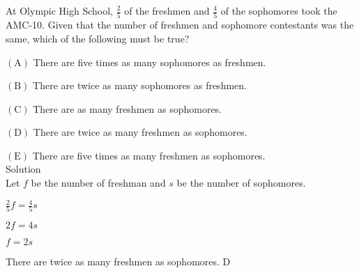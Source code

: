 
At Olympic High School, $\frac{2}{5}$ of the freshmen and $\frac{4}{5}$ of the sophomores took the AMC-10. Given that the number of freshmen and sophomore contestants was the same, which of the following must be true?

$\mathrm{(A)}$ There are five times as many sophomores as freshmen.

$\mathrm{(B)}$ There are twice as many sophomores as freshmen.

$\mathrm{(C)}$ There are as many freshmen as sophomores.

$\mathrm{(D)}$ There are twice as many freshmen as sophomores.

$\mathrm{(E)}$ There are five times as many freshmen as sophomores.
\\
Solution
\\
Let $f$ be the number of freshman and $s$ be the number of sophomores.

$\frac{2}{5}f=\frac{4}{5}s$

$2f = 4s$

$f=2s$

There are twice as many freshmen as sophomores. $\boxed{\text{D}}$
